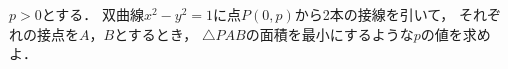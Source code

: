 \documentclass[../../main.tex]{subfiles}
\begin{document}
$p>0$とする．
双曲線$x^2-y^2=1$に点$P(0,p)$から2本の接線を引いて，
それぞれの接点を$A$，$B$とするとき，
$\triangle PAB$の面積を最小にするような$p$の値を求めよ．
\end{document}

